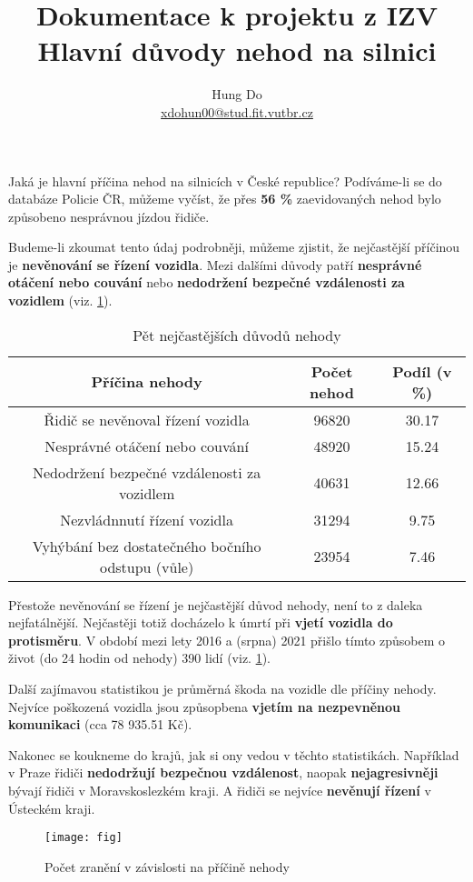 \documentclass[a4paper,11pt]{article}
\title{Dokumentace k projektu z IZV \\
        \large Hlavní důvody nehod na silnici}
\author{Hung Do \\ \href{mailto:xdohun00@stud.fit.vutbr.cz}{xdohun00@stud.fit.vutbr.cz}}
\begin{document}
    \maketitle
    Jaká je hlavní příčina nehod na silnicích v České republice? Podíváme-li se do databáze
    Policie ČR, můžeme vyčíst, že přes \textbf{56 \%} zaevidovaných nehod bylo způsobeno nesprávnou jízdou řidiče.

    Budeme-li zkoumat tento údaj podrobněji, můžeme zjistit, že nejčastější příčinou je \textbf{nevěnování se řízení vozidla}.
    Mezi dalšími důvody patří \textbf{nesprávné otáčení nebo couvání} nebo \textbf{nedodržení bezpečné vzdálenosti za vozidlem} (viz. \ref{table_accidents}).
    \begin{table}[ht]
        \centering
        \begin{tabular}{|c|c|c|} \hline
            \textbf{Příčina nehody}                             & \textbf{Počet nehod} & \textbf{Podíl (v \%)} \\ \hline
            Řidič se nevěnoval řízení vozidla                   & 96820 & 30.17 \\ \hline
            Nesprávné otáčení nebo couvání                      & 48920 & 15.24 \\ \hline
            Nedodržení bezpečné vzdálenosti za vozidlem         & 40631 & 12.66 \\ \hline
            Nezvládnnutí řízení vozidla                         & 31294 & 9.75 \\ \hline
            Vyhýbání bez dostatečného bočního odstupu (vůle)    & 23954 & 7.46 \\ \hline

        \end{tabular}
        \caption{Pět nejčastějších důvodů nehody}
        \label{table_accidents}
    \end{table}

    Přestože nevěnování se řízení je nejčastější důvod nehody, není to z daleka nejfatálnější. Nejčastěji totiž docházelo k úmrtí
    při \textbf{vjetí vozidla do protisměru}. V období mezi lety 2016 a (srpna) 2021
    přišlo tímto způsobem o život (do 24 hodin od nehody) 390 lidí (viz. \ref{figure_fatality}).

    Další zajímavou statistikou je průměrná škoda na vozidle dle příčiny nehody. Nejvíce poškozená vozidla jsou způsopbena
    \textbf{vjetím na nezpevněnou komunikaci} (cca 78 935.51 Kč).

    Nakonec se koukneme do krajů, jak si ony vedou v těchto statistikách. Například v Praze řidiči \textbf{nedodržují bezpečnou vzdálenost}, naopak \textbf{nejagresivněji}
    bývají řidiči v Moravskoslezkém kraji. A řidiči se nejvíce \textbf{nevěnují řízení} v Ústeckém kraji.
    \begin{figure}[ht]
        \centering
        \texttt{[image: fig]}
        \caption{Počet zranění v závislosti na příčině nehody}
        \label{figure_fatality}
    \end{figure}
\end{document}
